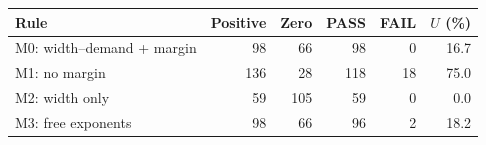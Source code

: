 \begin{tabular}{lrrrrr}
\toprule
Rule & Positive & Zero & PASS & FAIL & $U$ (\%) \\
\midrule
\rowcolor{tableblue}
M0: width--demand + margin & 98 & 66 & 98 & 0 & 16.7 \\
M1: no margin & 136 & 28 & 118 & 18 & 75.0 \\
M2: width only & 59 & 105 & 59 & 0 & 0.0 \\
M3: free exponents & 98 & 66 & 96 & 2 & 18.2 \\
\bottomrule
\end{tabular}
